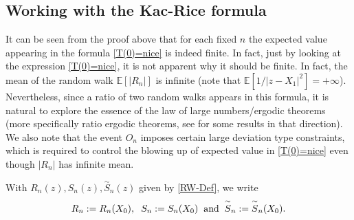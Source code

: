 \documentclass[9pt,a4paper,reqno]{amsart}
\newcommand{\tildea}[1]{\overset{\sim}{#1}}
\theoremstyle{mine}
\theoremstyle{definition}
\theoremstyle{remark}
\newcommand{\mb}{\mathbb}
\begin{document}
\subsection{Working with the Kac-Rice formula} \label{analyse-the-kac-rice}
It can be seen from the proof above that for each fixed $n$ the expected value appearing in the formula \eqref{T(0)=nice} is indeed finite. In fact, just by looking at the expression \eqref{T(0)=nice}, it is not apparent why it should be finite. In fact, the mean of the random walk $\mb{E}[|R_n|]$ is infinite (note that $\mb{E}[1/|z- X_1|^2] = + \infty$). Nevertheless, since a ratio of two random walks appears in this formula, it is natural to explore the essence of the law of large numbers/ergodic theorems (more specifically ratio ergodic theorems, see \cites{Aaronson-Jon-Anintroductiontoinfiniteergodictheory, Kamae-Keane-Asimpleproofoftheratioergodictheorem} for some results in that direction). We also note that the event $O_n$ imposes certain large deviation type constraints, which is required to control the blowing up of expected value in \eqref{T(0)=nice} even though $|R_n|$ has infinite mean. 



With $R_n(z), S_n(z), \tildea{S}_n(z)$ given by \eqref{RW-Def}, we write 
\begin{align}\label{def of S_n and S_n hat}
   R_n := R_n(X_0),  \textrm{\hspace{2mm}}  S_n := S_n(X_0)  \textrm{\hspace{2mm}and\hspace{2mm}} \tildea{S}_n := \tildea{S}_n(X_0). 
\end{align}
\end{document}
